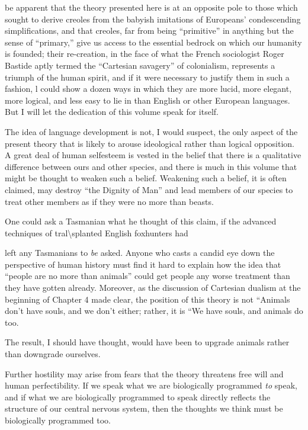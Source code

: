 be apparent that the theory presented here is at an opposite pole to those which sought to derive creoles from the babyish imitations of Europeans' condescending simplifications, and that creoles, far from being ``primitive'' in anything but the sense of ``primary,'' give us access to the essential bedrock on which our humanity is founded; their re-creation, in the face of what the French sociologist Roger Bastide aptly termed the ``Cartesian savagery'' of colonialism, repre\-sents a triumph of the human spirit, and if it were necessary to justify them in such a fashion, l could show a dozen ways in which they are more lucid, more elegant, more logical, and less easy to lie in than English or other European languages. But I will let the dedication of this volume speak for itself.

The idea of language development is not, I would suspect, the only aspect of the present theory that is likely to arouse ideological rather than logical opposition. A great deal of human self{\textquotedbl}esteem is vested in the belief that there is a qualitative difference between ours and other species, and there is much in this volume that might be thought to weaken such a belief. Weakening such a belief, it is often claimed, may destroy ``the Dignity of Man'' and lead members of our species to treat other members as if they were no more than beasts.

One could ask a Tasmanian what he thought of this claim, if the advanced techniques of tral{\textbackslash}splanted English foxhunters had


left any Tasmanians to \textit{be} asked. Anyone who casts a candid eye down the perspective of human history must find it hard to explain how the idea that ``people are no more than animals'' could get people any worse treatment than they have gotten already. Moreover, as the discussion of Cartesian dualism at the beginning of Chapter 4 made clear, the position of this theory is not ``Animals don't have souls, and we don't either{\textquotedbl}; rather, it is ``We have souls, and animals do too.{\textquotedbl}

The result, I should have thought, would have been to upgrade animals rather than downgrade ourselves.

Further hostility may arise from fears that the theory threatens free will and human perfectibility. If we speak what we are biologically programmed \textit{to} speak, and if what we are biologically programmed to speak directly reflects the structure of our central nervous system, then the thoughts we think must be biologically programmed too.

